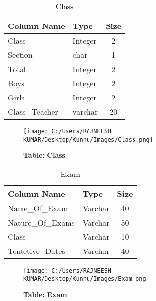 \begin{table}[h!]
	\begin{center}
		\caption{Class}
			\begin{tabular}{| l | l | c |}
				\hline
				Column Name & Type & Size \\
				\hline
				Class & Integer & 2 \\
				Section & char & 1 \\
				Total & Integer & 2 \\
				Boys & Integer & 2 \\
				Girls & Integer & 2 \\
				Class\_Teacher & varchar & 20 \\
				\hline
			\end{tabular}
		\end{center}
	\end{table}

\begin{figure}[H]
  \centering
    \texttt{[image: C:/Users/RAJNEESH KUMAR/Desktop/Kunnu/Images/Class.png]}
    \caption{\textbf{Table: Class}}
\end{figure}


\begin{table}[h!]
	\begin{center}
		\caption{Exam}
			\begin{tabular}{| l | l | c |}
				\hline
				Column Name & Type & Size \\
				\hline
				Name\_Of\_Exam & Varchar & 40 \\
				Nature\_Of\_Exams & Varchar & 50 \\
				Class & Varchar & 10 \\
				Tentetive\_Dates & Varchar & 40 \\
				\hline
			\end{tabular}	
		\end{center}
	\end{table}
	
\begin{figure}[H]
  \centering
    \texttt{[image: C:/Users/RAJNEESH KUMAR/Desktop/Kunnu/Images/Exam.png]}
    \caption{\textbf{Table: Exam}}
\end{figure}
